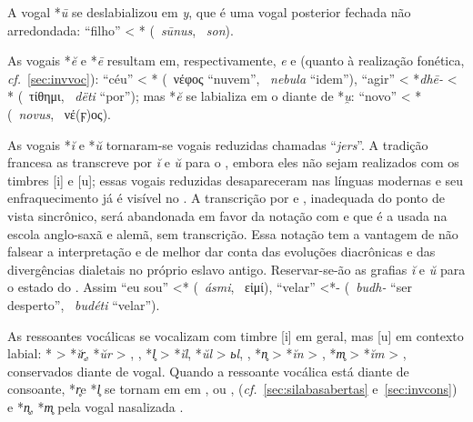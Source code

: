 A vogal *\emph{ū} se deslabializou em \emph{y}, que é uma vogal posterior fechada não
arredondada:  ``filho'' < *
(~\emph{sūnus}, ~\emph{son}).

As vogais *\emph{ĕ} e *\emph{ē} resultam em, respectivamente, \emph{e} e
 (quanto à realização fonética, \emph{cf.}~\ref{sec:invvoc}):
 ``céu'' < * (~νέφος
``nuvem'', ~\emph{nebula} ``idem''),
 ``agir'' < *\emph{dhē-} < *
(~τίθημι, ~\emph{dëti} ``por''); mas
*\emph{ĕ} se labializa em o diante de *\emph{u̯}:  ``novo''
< * (~\emph{novus},
~νέ{(ϝ)}ος).

As vogais *\emph{ĭ} e *\emph{ŭ} tornaram-se vogais reduzidas chamadas ``\emph{jers}''.
A tradição francesa as transcreve por \emph{ĭ} e \emph{ŭ} para o ,
embora eles não sejam realizados com os timbres [i] e [u]; essas vogais
reduzidas desapareceram nas línguas modernas e seu enfraquecimento já é visível
no .
A transcrição por  e , inadequada do ponto de vista
sincrônico, será abandonada em favor da notação com  e 
que é a usada na escola anglo-saxã e alemã, sem transcrição.
Essa notação tem a vantagem de não falsear a interpretação e de melhor dar conta
das evoluções diacrônicas e das divergências dialetais no próprio eslavo
antigo.
Reservar-se-ão as grafias \emph{ĭ} e \emph{ŭ} para o estado do .
Assim  ``eu sou'' <*
(~\emph{ásmi}, ~εἰμί),
 ``velar'' <*-
(~\emph{budh-} ``ser desperto'',
~\emph{budéti} ``velar'').

As ressoantes vocálicas se vocalizam com timbre [i] em geral, mas [u] em
contexto labial: * > *\emph{ĭr̥}, *\emph{ŭr} > ,
, *\emph{l̥} > *\emph{ĭl}, *\emph{ŭl} > \emph{ьl}, ,
*\emph{n̥} > *\emph{ĭn} > , *\emph{m̥} > *\emph{ĭm} > ,
conservados diante de vogal.
Quando a ressoante vocálica está diante de consoante, *\emph{r̥}e *\emph{l̥} se
tornam em  em ,  ou , 
(\emph{cf.}~\ref{sec:silabasabertas} e~\ref{sec:invcons}) e *\emph{n̥}, *\emph{m̥}
pela vogal nasalizada .

